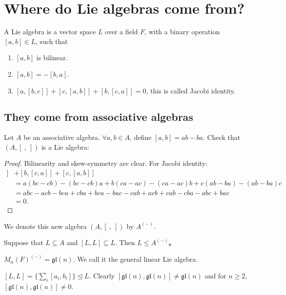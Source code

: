 \section{Where do Lie algebras come from?}

\begin{definition}
    A Lie algebra is a vector space $ L $ over a field $ F $, with a binary operation $ [a,b] \in L $, such that
    \begin{enumerate}
        \item $ [a,b] $ is bilinear.
        \item $ [a,b] = -[b,a] $.
        \item $ [a,[b,c]] + [c,[a,b]] + [b,[c,a]] = 0 $, this is called Jacobi identity.
    \end{enumerate}
\end{definition}

\subsection{They come from associative algebras}

Let $ A $ be an associative algebra. $ \forall a,b \in A $, define $ [a,b]=ab-ba $. Check that $ (A,[ \ ,\  ]) $ is a Lie algebra:

\begin{proof}
    Bilinearity and skew-symmetry are clear. For Jacobi identity:
    \begin{align*}
        [a,[b,c]] & + [b,[c,a]] + [c,[a,b]]                                                 \\
                  & = a(bc-cb) - (bc-cb)a + b(ca-ac) - (ca-ac)b + c(ab-ba) - (ab-ba)c       \\
                  & = abc - acb - bca + cba + bca - bac - cab + acb + cab - cba - abc + bac \\
                  & = 0.
    \end{align*}
\end{proof}

We denote this new algebra $ (A,[ \ ,\  ]) $ by $ A^{(-)} $.

Suppose that $ L \subseteq A $ and $ [L,L] \subseteq L $. Then $ L \le A^{(-)} $。

\begin{example}
    $ M_n(F)^{(-)}=\mathfrak{gl}(n) $. We call it the general linear Lie algebra.

    $ [L,L]=\{ \sum_{i} [a_i,b_i] \} \trianglelefteq L $. Clearly $ [\mathfrak{gl}(n),\mathfrak{gl}(n)] \neq \mathfrak{gl}(n) $ and for $ n \ge 2 $, $ [\mathfrak{gl}(n),\mathfrak{gl}(n)]\neq 0 $.
\end{example}

